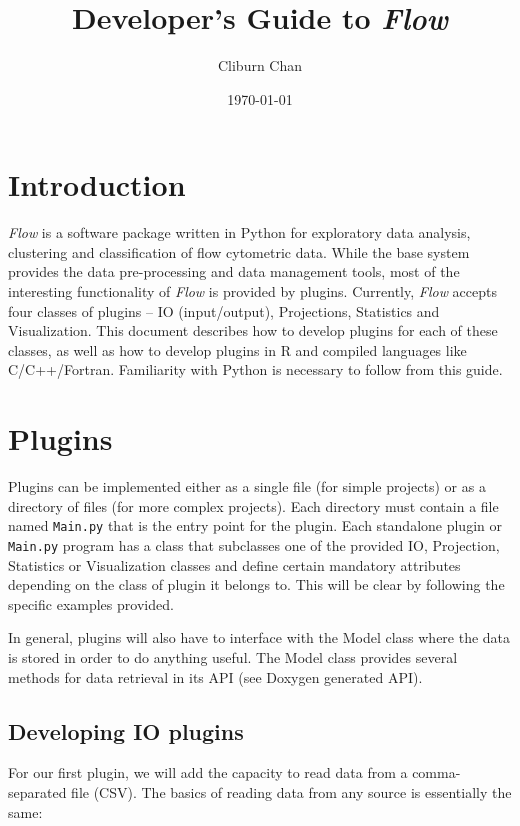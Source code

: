 \documentclass{article}
\begin{document}
\title{Developer's Guide to \emph{Flow}}
\author{Cliburn Chan}
\date{\today}
\maketitle

\section*{Introduction}

\emph{Flow} is a software package written in Python for exploratory
data analysis, clustering and classification of flow cytometric
data. While the base system provides the data pre-processing and data
management tools, most of the interesting functionality of \emph{Flow}
is provided by plugins. Currently, \emph{Flow} accepts four classes of
plugins – IO (input/output), Projections, Statistics and
Visualization. This document describes how to develop plugins for each
of these classes, as well as how to develop plugins in R and compiled
languages like C/C++/Fortran. Familiarity with Python is necessary to
follow from this guide.

\section*{Plugins}

Plugins can be implemented either as a single file (for simple
projects) or as a directory of files (for more complex projects). Each
directory must contain a file named \texttt{Main.py} that is the entry
point for the plugin. Each standalone plugin or \texttt{Main.py}
program has a class that subclasses one of the provided IO,
Projection, Statistics or Visualization classes and define certain
mandatory attributes depending on the class of plugin it belongs
to. This will be clear by following the specific examples provided.

In general, plugins will also have to interface with the Model class
where the data is stored in order to do anything useful. The Model
class provides several methods for data retrieval in its API (see
Doxygen generated API).

\subsection*{Developing IO plugins}

For our first plugin, we will add the capacity to read data from a
comma-separated file (CSV). The basics of reading data from any source
is essentially the same:
\end{document}
